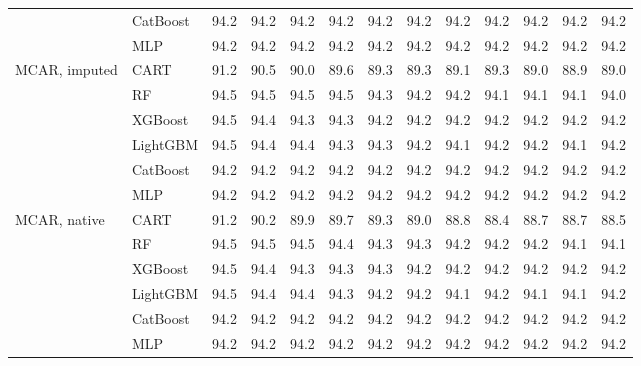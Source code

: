 \begin{table}[p]
\begin{tabular}{@{}llrrrrrrrrrrr@{}}
 & CatBoost & 94.2 & 94.2 & 94.2 & 94.2 & 94.2 & 94.2 & 94.2 & 94.2 & 94.2 & 94.2 & 94.2 \\
 & MLP & 94.2 & 94.2 & 94.2 & 94.2 & 94.2 & 94.2 & 94.2 & 94.2 & 94.2 & 94.2 & 94.2 \\
\midrule
MCAR, imputed & CART & 91.2 & 90.5 & 90.0 & 89.6 & 89.3 & 89.3 & 89.1 & 89.3 & 89.0 & 88.9 & 89.0 \\
 & RF & 94.5 & 94.5 & 94.5 & 94.5 & 94.3 & 94.2 & 94.2 & 94.1 & 94.1 & 94.1 & 94.0 \\
 & XGBoost & 94.5 & 94.4 & 94.3 & 94.3 & 94.2 & 94.2 & 94.2 & 94.2 & 94.2 & 94.2 & 94.2 \\
 & LightGBM & 94.5 & 94.4 & 94.4 & 94.3 & 94.3 & 94.2 & 94.1 & 94.2 & 94.2 & 94.1 & 94.2 \\
 & CatBoost & 94.2 & 94.2 & 94.2 & 94.2 & 94.2 & 94.2 & 94.2 & 94.2 & 94.2 & 94.2 & 94.2 \\
 & MLP & 94.2 & 94.2 & 94.2 & 94.2 & 94.2 & 94.2 & 94.2 & 94.2 & 94.2 & 94.2 & 94.2 \\
\midrule
MCAR, native & CART & 91.2 & 90.2 & 89.9 & 89.7 & 89.3 & 89.0 & 88.8 & 88.4 & 88.7 & 88.7 & 88.5 \\
 & RF & 94.5 & 94.5 & 94.5 & 94.4 & 94.3 & 94.3 & 94.2 & 94.2 & 94.2 & 94.1 & 94.1 \\
 & XGBoost & 94.5 & 94.4 & 94.3 & 94.3 & 94.3 & 94.2 & 94.2 & 94.2 & 94.2 & 94.2 & 94.2 \\
 & LightGBM & 94.5 & 94.4 & 94.4 & 94.3 & 94.2 & 94.2 & 94.1 & 94.2 & 94.1 & 94.1 & 94.2 \\
 & CatBoost & 94.2 & 94.2 & 94.2 & 94.2 & 94.2 & 94.2 & 94.2 & 94.2 & 94.2 & 94.2 & 94.2 \\
 & MLP & 94.2 & 94.2 & 94.2 & 94.2 & 94.2 & 94.2 & 94.2 & 94.2 & 94.2 & 94.2 & 94.2 \\
\bottomrule
\end{tabular}
\end{table}

